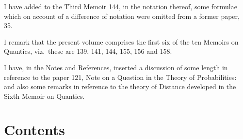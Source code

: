 \documentclass[11pt,a4paper]{article}
\theoremstyle{plain}
\begin{document}
I have added to the Third Memoir 144, in the notation thereof, some formulae which on account of a difference of notation were omitted from a former paper, 35.

I remark that the present volume comprises the first six of the ten Memoirs on Quantics, viz.\ these are 139, 141, 144, 155, 156 and 158.

I have, in the Notes and References, inserted a discussion of some length in reference to the paper 121, Note on a Question in the Theory of Probabilities: and also some remarks in reference to the theory of Distance developed in the Sixth Memoir on Quantics.
\clearpage

\section*{Contents}
\end{document}
